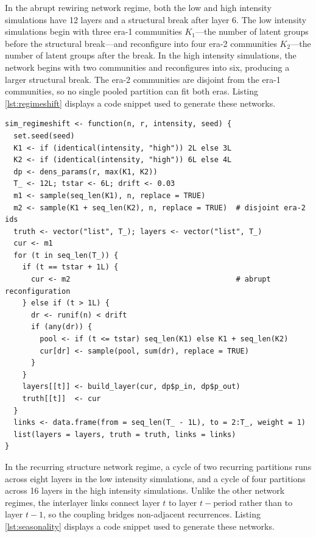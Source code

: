 \documentclass[11pt, letterpaper]{article}
\numberwithin{equation}{section}
\begin{document}
In the abrupt rewiring network regime, both the low and high intensity simulations have 12 layers and a structural break after layer 6. The low intensity simulations begin with three era-1 communities $K_1$---the number of latent groups before the structural break---and reconfigure into four era-2
communities $K_2$---the number of latent groups after the break. In the high intensity simulations, the network begins with two communities and reconfigures into six, producing a larger structural break. The era-2 communities are disjoint from the era-1 communities, so no single pooled
partition can fit both eras. Listing \ref{lst:regimeshift} displays a code snippet used to generate these networks.

\begin{lstlisting}[caption={Abrupt rewiring generator.},
                   label={lst:regimeshift}]
sim_regimeshift <- function(n, r, intensity, seed) {
  set.seed(seed)
  K1 <- if (identical(intensity, "high")) 2L else 3L
  K2 <- if (identical(intensity, "high")) 6L else 4L
  dp <- dens_params(r, max(K1, K2))
  T_ <- 12L; tstar <- 6L; drift <- 0.03
  m1 <- sample(seq_len(K1), n, replace = TRUE)
  m2 <- sample(K1 + seq_len(K2), n, replace = TRUE)  # disjoint era-2 ids
  truth <- vector("list", T_); layers <- vector("list", T_)
  cur <- m1
  for (t in seq_len(T_)) {
    if (t == tstar + 1L) {
      cur <- m2                                      # abrupt reconfiguration
    } else if (t > 1L) {
      dr <- runif(n) < drift
      if (any(dr)) {
        pool <- if (t <= tstar) seq_len(K1) else K1 + seq_len(K2)
        cur[dr] <- sample(pool, sum(dr), replace = TRUE)
      }
    }
    layers[[t]] <- build_layer(cur, dp$p_in, dp$p_out)
    truth[[t]]  <- cur
  }
  links <- data.frame(from = seq_len(T_ - 1L), to = 2:T_, weight = 1)
  list(layers = layers, truth = truth, links = links)
}
\end{lstlisting}
 
In the recurring structure network regime, a cycle of two recurring partitions runs across eight layers in the low intensity simulations, and a cycle of four partitions across 16 layers in the high intensity simulations. Unlike the other network regimes, the interlayer links connect layer $t$ to layer $t-\text{period}$ rather than to layer $t-1$, so the coupling bridges non-adjacent recurrences. Listing \ref{lst:seasonality} displays a code snippet used to generate these networks.
\end{document}
